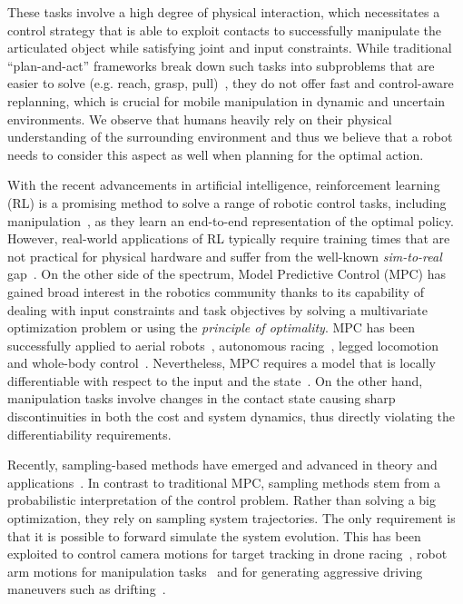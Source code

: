 These tasks involve a high degree of physical interaction, which necessitates a control strategy that is able to exploit contacts to successfully manipulate the articulated object while satisfying joint and input constraints. While traditional ``plan-and-act'' frameworks break down such tasks into subproblems that are easier to solve (e.g. reach, grasp, pull)~\cite{Murali2020}, they do not offer fast and control-aware replanning, which is crucial for mobile manipulation  in dynamic and uncertain environments. We observe that humans heavily rely on their physical understanding of the surrounding environment and thus we believe that a robot needs to consider this aspect as well when planning for the optimal action.

With the recent advancements in artificial intelligence, reinforcement learning (RL) is a promising method to solve a range of robotic control tasks, including manipulation~\cite{finn2016deep}, as they learn an end-to-end representation of the optimal policy. However, real-world applications of RL typically require training times that are not practical for physical hardware and suffer from the well-known \emph{sim-to-real} gap~\cite{chebotar2019closing}. 
On the other side of the spectrum, Model Predictive Control (MPC) has gained broad interest in the robotics community thanks to its capability of dealing with input constraints and task objectives by solving a multivariate optimization problem or using the \emph{principle of optimality}. 
MPC has been successfully applied to aerial robots~\cite{brunner2020trajectory}, autonomous racing~\cite{liniger2015optimization}, legged locomotion~\cite{grandia2019frequency} and whole-body control~\cite{minniti2019whole}. Nevertheless, MPC requires a model that is locally differentiable with respect to the input and the state~\cite{buchli2017optimal}. On the other hand, manipulation tasks involve changes in the contact state causing sharp discontinuities in both the cost and system dynamics, thus directly violating the differentiability requirements. 

Recently, sampling-based methods have emerged and advanced in theory and applications~\cite{lee_aggressive_2020,abraham_model-based_2020,rajamaki_augmenting_2017}. 
In contrast to traditional MPC, sampling methods stem from a probabilistic interpretation of the control problem. 
Rather than solving a big optimization, they rely on sampling system trajectories. The only requirement is that it is possible to forward simulate the system evolution. This has been exploited to control camera motions for target tracking in drone racing~\cite{lee_aggressive_2020}, robot arm motions for manipulation tasks~\cite{abraham_model-based_2020} and for generating aggressive driving maneuvers such as drifting~\cite{williams_information_2017}. 

